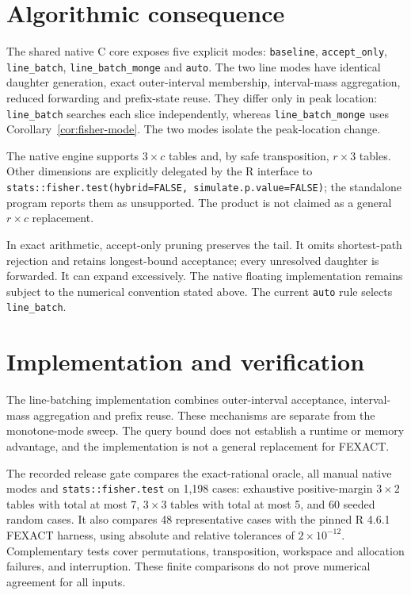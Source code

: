 \documentclass[10pt]{article}
\begin{document}
\section{Algorithmic consequence}

The shared native C core exposes five explicit modes:
\texttt{baseline}, \texttt{accept\_only}, \texttt{line\_batch},
\texttt{line\_batch\_monge} and \texttt{auto}.  The two line modes have
identical daughter generation, exact outer-interval membership,
interval-mass aggregation, reduced forwarding and prefix-state reuse.
They differ only in peak location: \texttt{line\_batch} searches each
slice independently, whereas \texttt{line\_batch\_monge} uses
Corollary~\ref{cor:fisher-mode}. The two modes isolate the peak-location change.

The native engine supports \(3\times c\) tables and, by safe
transposition, \(r\times3\) tables.  Other dimensions are explicitly
delegated by the R interface to
\texttt{stats::fisher.test(hybrid=FALSE, simulate.p.value=FALSE)};
the standalone program reports them as unsupported.  The product is not
claimed as a general \(r\times c\) replacement.

In exact arithmetic, accept-only pruning preserves the tail. It omits
shortest-path rejection and retains longest-bound acceptance; every
unresolved daughter is forwarded.  It can expand excessively. The native floating implementation remains
subject to the numerical convention stated above.  The current \texttt{auto} rule selects
\texttt{line\_batch}.

\section{Implementation and verification}

The line-batching implementation combines outer-interval acceptance,
interval-mass aggregation and prefix reuse. These mechanisms are separate
from the monotone-mode sweep. The query bound does not establish a runtime
or memory advantage, and the implementation is not a general replacement
for FEXACT.

The recorded release gate compares the exact-rational oracle, all manual
native modes and \texttt{stats::fisher.test} on 1,198 cases: exhaustive
positive-margin \(3\times2\) tables with total at most 7, \(3\times3\)
tables with total at most 5, and 60 seeded random cases. It also compares
48 representative cases with the pinned R 4.6.1 FEXACT harness, using
absolute and relative tolerances of \(2\times10^{-12}\). Complementary
tests cover permutations, transposition, workspace and allocation failures,
and interruption. These finite comparisons do not prove numerical agreement
for all inputs.
\end{document}
